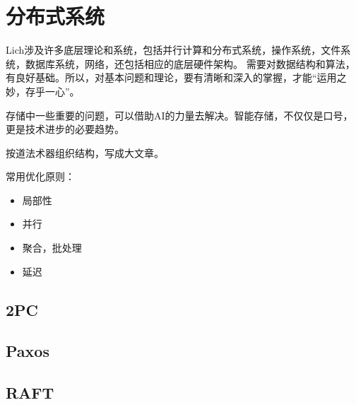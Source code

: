 \chapter{分布式系统}

Lich涉及许多底层理论和系统，包括并行计算和分布式系统，操作系统，文件系统，数据库系统，网络，还包括相应的底层硬件架构。
需要对数据结构和算法，有良好基础。所以，对基本问题和理论，要有清晰和深入的掌握，才能“运用之妙，存乎一心”。

存储中一些重要的问题，可以借助AI的力量去解决。智能存储，不仅仅是口号，更是技术进步的必要趋势。

按道法术器组织结构，写成大文章。

常用优化原则：
\begin{itemize}
    \item 局部性
    \item 并行
    \item 聚合，批处理
    \item 延迟
\end{itemize}

\section{2PC}

\section{Paxos}

\section{RAFT}
